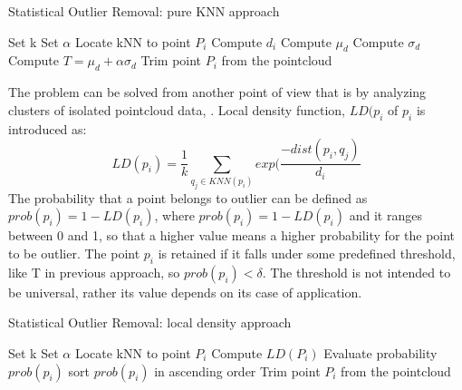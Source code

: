 \begin{algorithm}
\caption{Statistical Outlier Removal: pure KNN approach}\label{alg:statistical}
\begin{algorithmic}
\STATE Set k
\STATE Set $\alpha$
    \STATE Locate kNN to point $P_i$
    \STATE Compute $d_i$ 
\ENDFOR
\STATE Compute $\mu_d$
\STATE Compute $\sigma_d$
\STATE Compute $T = \mu_d + \alpha \sigma_d$
\STATE Trim point $P_i$ from the pointcloud
\ENDIF
\end{algorithmic}
\end{algorithm}

The problem can be solved from another point of view that is by analyzing clusters of isolated pointcloud data, \citet{10.1371/journal.pone.0201280}.
Local density function, $LD(p_{i}$ of $p_{i}$ is introduced as:
\begin{equation}
    LD(p_{i}) = \frac{1}{k} \sum_{q_j \in KNN(p_i)} exp(\frac{-dist(p_i,q_j)}{d_i}
\end{equation}
The probability that a point belongs to outlier can be defined as $prob(p_i) = 1 - LD(p_i)$, where $prob(p_i) = 1 - LD(p_i)$ and it ranges between 0 and 1, so that a higher value means a higher probability for the point to be outlier.
The point $p_i$ is retained if it falls under some predefined threshold, like T in previous approach, so $prob(p_i) < \delta$.
The threshold is not intended to be universal, rather its value depends on its case of application.

\begin{algorithm}[H]
\caption{Statistical Outlier Removal: local density approach}\label{alg:statistical2}
\begin{algorithmic}
\STATE Set k
\STATE Set $\alpha$
    \STATE Locate kNN to point $P_i$
    \STATE Compute $LD(P_i)$
    \STATE Evaluate probability $prob(p_i)$
\ENDFOR
\STATE sort $prob(p_i)$ in ascending order
\STATE Trim point $P_i$ from the pointcloud
\ENDIF
\end{algorithmic}
\end{algorithm}

